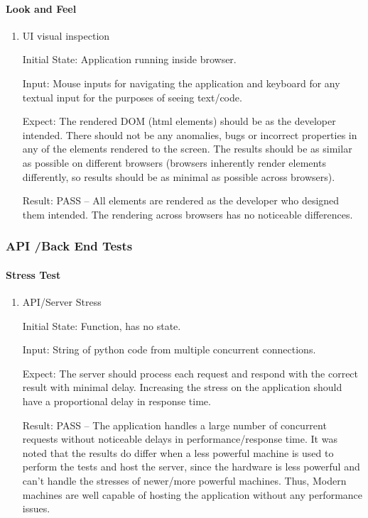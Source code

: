 \documentclass[12pt, titlepage]{article}
\begin{document}
    \paragraph{Look and Feel}

    \begin{enumerate}

    \item{UI visual inspection\\} \label{visual}

    Initial State: Application running inside browser.

    Input: Mouse inputs for navigating the application and keyboard for any textual
    input for the purposes of seeing text/code.

		Expect: The rendered DOM (html elements) should be as the developer intended. There should not be
		any anomalies, bugs or incorrect properties in any of the elements rendered to
		the screen. The results should be as similar as possible on different browsers
		(browsers inherently render elements differently, so results should be as
		minimal as possible across browsers).

		Result: PASS -- All elements are rendered as the developer who designed them
		intended. The rendering across browsers has no noticeable differences.

    \end{enumerate}

  \subsubsection{API /Back End Tests}
  \paragraph{Stress Test}
      
    \begin{enumerate}

    \item{API/Server Stress\\} \label{stressTest}

    Initial State: Function, has no state.

    Input: String of python code from multiple concurrent connections.

		Expect: The server should process each request and respond with the
		correct result with minimal delay. Increasing the stress on the
		application should have a proportional delay in response time.

		Result: PASS -- The application handles a large number of concurrent requests
		without noticeable delays in performance/response time. It was noted that
		the results do differ when a less powerful machine is used to perform the tests
		and host the server, since the hardware is less powerful and can't handle the
		stresses of newer/more powerful machines. Thus, Modern machines are well
		capable of hosting the application without any performance issues.

    \end{enumerate}
\end{document}

